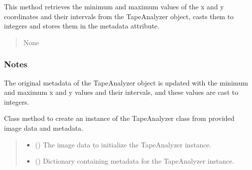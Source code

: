 \documentclass[letterpaper,10pt,english]{sphinxmanual}
\begin{document}
\begin{fulllineitems}
\begin{fulllineitems}
\sphinxAtStartPar
This method retrieves the minimum and maximum values of the x and y coordinates
and their intervals from the TapeAnalyzer object, casts them to integers and stores them
in the metadata attribute.
\begin{quote}\begin{description}
\sphinxAtStartPar
{} \textendash{} 

\sphinxAtStartPar
None

\end{description}\end{quote}
\subsubsection*{Notes}

\sphinxAtStartPar
The original metadata of the TapeAnalyzer object is updated with the minimum and maximum x and y values
and their intervals, and these values are cast to integers.

\end{fulllineitems}


\begin{fulllineitems}
\label{\detokenize{forensicfit.core.tape:forensicfit.core.tape.TapeAnalyzer.from_dict}}
\pysigstartsignatures
{}
\pysigstopsignatures
\sphinxAtStartPar
Class method to create an instance of the TapeAnalyzer class from provided image data and metadata.
\begin{quote}\begin{description}
\begin{itemize}
\item {} 
\sphinxAtStartPar
{} () \textendash{} The image data to initialize the TapeAnalyzer instance.

\item {} 
\sphinxAtStartPar
{} () \textendash{} Dictionary containing metadata for the TapeAnalyzer instance.


\end{itemize}
\end{description}
\end{quote}
\end{fulllineitems}
\end{fulllineitems}
\end{document}

